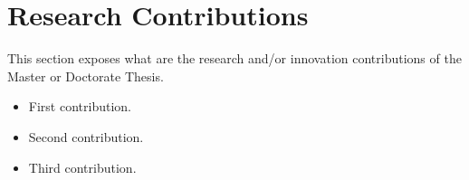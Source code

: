 \section{Research Contributions}
\label{sec:research_contributions}

This section exposes what are the research and/or innovation contributions of the Master or Doctorate Thesis.

\begin{itemize}
    \item First contribution.
    
    \item Second contribution.
    
    \item Third contribution.
\end{itemize}